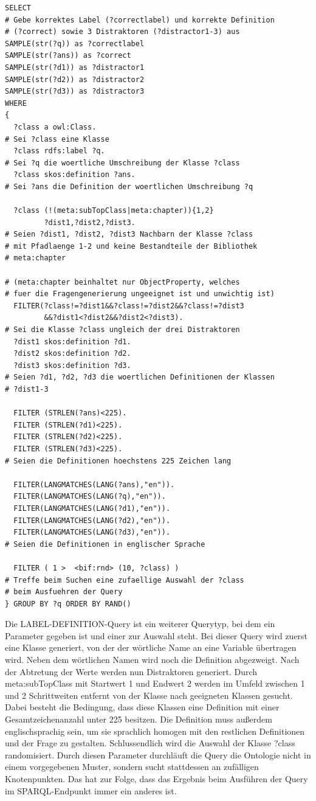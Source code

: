 \documentclass[headsepline,titlepage,ngerman,twoside,12pt]{report}
\begin{document}
\begin{lstlisting}
SELECT
# Gebe korrektes Label (?correctlabel) und korrekte Definition
# (?correct) sowie 3 Distraktoren (?distractor1-3) aus
SAMPLE(str(?q)) as ?correctlabel
SAMPLE(str(?ans)) as ?correct
SAMPLE(str(?d1)) as ?distractor1
SAMPLE(str(?d2)) as ?distractor2
SAMPLE(str(?d3)) as ?distractor3
WHERE
{
  ?class a owl:Class.
# Sei ?class eine Klasse
  ?class rdfs:label ?q.
# Sei ?q die woertliche Umschreibung der Klasse ?class
  ?class skos:definition ?ans.
# Sei ?ans die Definition der woertlichen Umschreibung ?q

  ?class (!(meta:subTopClass|meta:chapter)){1,2}
         ?dist1,?dist2,?dist3.
# Seien ?dist1, ?dist2, ?dist3 Nachbarn der Klasse ?class
# mit Pfadlaenge 1-2 und keine Bestandteile der Bibliothek
# meta:chapter

# (meta:chapter beinhaltet nur ObjectProperty, welches
# fuer die Fragengenerierung ungeeignet ist und unwichtig ist)
  FILTER(?class!=?dist1&&?class!=?dist2&&?class!=?dist3
         &&?dist1<?dist2&&?dist2<?dist3).
# Sei die Klasse ?class ungleich der drei Distraktoren
  ?dist1 skos:definition ?d1.
  ?dist2 skos:definition ?d2.
  ?dist3 skos:definition ?d3.
# Seien ?d1, ?d2, ?d3 die woertlichen Definitionen der Klassen
# ?dist1-3

  FILTER (STRLEN(?ans)<225).
  FILTER (STRLEN(?d1)<225).
  FILTER (STRLEN(?d2)<225).
  FILTER (STRLEN(?d3)<225).
# Seien die Definitionen hoechstens 225 Zeichen lang

  FILTER(LANGMATCHES(LANG(?ans),"en")).
  FILTER(LANGMATCHES(LANG(?q),"en")).
  FILTER(LANGMATCHES(LANG(?d1),"en")).
  FILTER(LANGMATCHES(LANG(?d2),"en")).
  FILTER(LANGMATCHES(LANG(?d3),"en")).
# Seien die Definitionen in englischer Sprache

  FILTER ( 1 >  <bif:rnd> (10, ?class) )
# Treffe beim Suchen eine zufaellige Auswahl der ?class
# beim Ausfuehren der Query
} GROUP BY ?q ORDER BY RAND()
\end{lstlisting}

Die LABEL-DEFINITION-Query ist ein weiterer Querytyp, bei dem ein Parameter gegeben ist und einer zur Auswahl steht.
Bei dieser Query wird zuerst eine Klasse generiert, von der der wörtliche Name an eine Variable übertragen wird.
Neben dem wörtlichen Namen wird noch die Definition abgezweigt.
Nach der Abtretung der Werte werden nun Distraktoren generiert.
Durch meta:subTopClass mit Startwert 1 und Endwert 2 werden im Umfeld zwischen 1 und 2 Schrittweiten entfernt von der Klasse nach geeigneten Klassen gesucht.
Dabei besteht die Bedingung, dass diese Klassen eine Definition mit einer Gesamtzeichenanzahl unter 225 besitzen.
Die Definition muss außerdem englischsprachig sein, um sie sprachlich homogen mit den restlichen Definitionen und der Frage zu gestalten.
Schlussendlich wird die Auswahl der Klasse ?class randomisiert.
Durch diesen Parameter durchläuft die Query die Ontologie nicht in einem vorgegebenen Muster, sondern sucht stattdessen an zufälligen Knotenpunkten.
Das hat zur Folge, dass das Ergebnis beim Ausführen der Query im SPARQL-Endpunkt immer ein anderes ist.
\end{document}
